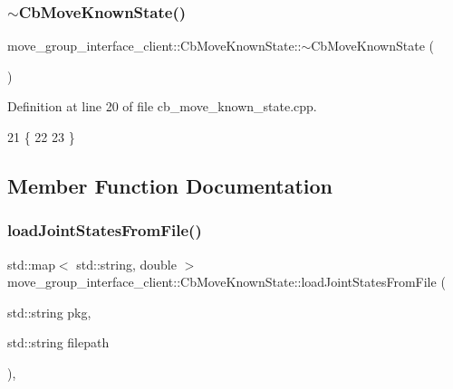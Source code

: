 \subsubsection{\texorpdfstring{$\sim$\+Cb\+Move\+Known\+State()}{~CbMoveKnownState()}}
{\footnotesize\ttfamily move\+\_\+group\+\_\+interface\+\_\+client\+::\+Cb\+Move\+Known\+State\+::$\sim$\+Cb\+Move\+Known\+State (\begin{DoxyParamCaption}{ }\end{DoxyParamCaption})\hspace{0.3cm}{\ttfamily [virtual]}}



Definition at line 20 of file cb\+\_\+move\+\_\+known\+\_\+state.\+cpp.


\begin{DoxyCode}
21 \{
22   
23 \}
\end{DoxyCode}


\subsection{Member Function Documentation}
\mbox{\label{classmove__group__interface__client_1_1CbMoveKnownState_af00c5ee81dfa5dd0817135279df09d74}} 
\subsubsection{\texorpdfstring{load\+Joint\+States\+From\+File()}{loadJointStatesFromFile()}}
{\footnotesize\ttfamily std\+::map$<$ std\+::string, double $>$ move\+\_\+group\+\_\+interface\+\_\+client\+::\+Cb\+Move\+Known\+State\+::load\+Joint\+States\+From\+File (\begin{DoxyParamCaption}\item[{std\+::string}]{pkg,  }\item[{std\+::string}]{filepath }\end{DoxyParamCaption})\hspace{0.3cm}{\ttfamily [static]}, {\ttfamily [private]}}



